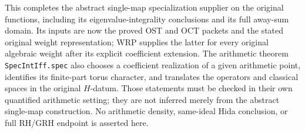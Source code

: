 This completes the abstract single-map specialization
supplier on the original functions, including its
eigenvalue-integrality conclusions and its full away-sum
domain.  Its inputs are now the proved OST and OCT
packets and the stated original weight representation;
WRP supplies the latter for every original algebraic
weight after its explicit coefficient extension.
The arithmetic theorem \texttt{SpecIntIff.spec} also
chooses a coefficient realization of a given arithmetic
point, identifies its finite-part torus character,
and translates the operators and classical spaces in
the original $H$-datum.  Those statements must be
checked in their own quantified arithmetic setting;
they are not inferred merely from the abstract
single-map construction.  No arithmetic density,
same-ideal Hida conclusion, or full RH/GRH endpoint
is asserted here.
